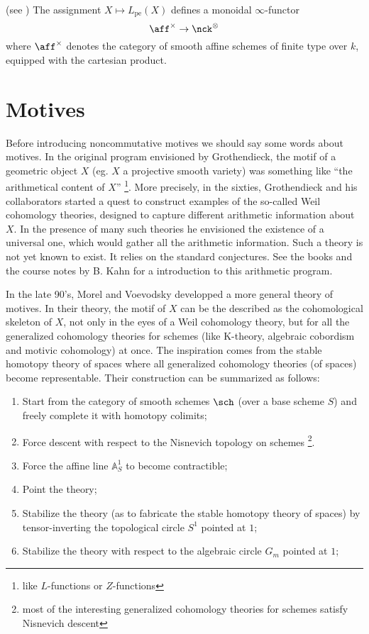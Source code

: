 \begin{refsection}
\begin{prop}(see \cite[6.38]{nc1})
The assignment $X\mapsto L_\mathrm{pe}(X)$ defines a monoidal $\infty$-functor 
$$\aff^{\times}\to \nck^{\otimes}$$
\noindent where $\aff^{\times}$ denotes the category of smooth affine schemes of finite type over $k$, equipped with the cartesian product.
\end{prop}

\section{Motives}

Before introducing noncommutative motives we should say some words about motives. In the original program envisioned by Grothendieck, the motif of a geometric object $X$ (eg. $X$ a projective smooth variety) was something like ``the arithmetical content of $X$'' \footnote{like $L$-functions or $Z$-functions}. More precisely, in the sixties, Grothendieck and his collaborators started a quest to construct examples of the so-called Weil cohomology theories, designed to capture different arithmetic information about $X$. In the presence of many such theories he envisioned the existence of a universal one, which would gather all the arithmetic information. Such a theory is not yet known to exist. It relies on the standard conjectures. See the books \cite{MR2115000, motivesSeattle} and the course notes by B. Kahn \cite{kahnzetamotives} for a introduction to this arithmetic program.

In the late 90's, Morel and Voevodsky \cite{voevodsky-morel} developped a more general theory of motives. In their theory, the motif of $X$ can be the described as the cohomological skeleton of $X$, not only in the eyes of a Weil cohomology theory, but for all the generalized cohomology theories for schemes (like K-theory, algebraic cobordism and motivic cohomology) at once. The inspiration comes from the stable homotopy theory of spaces where all generalized cohomology theories (of spaces) become representable. Their construction can be summarized as follows:

\begin{enumerate}
\item Start from the category of smooth schemes $\sch$ (over a base scheme $S$) and freely complete it with homotopy colimits;
\item Force descent with respect to the Nisnevich topology on schemes \footnote{most of the interesting generalized cohomology theories for schemes satisfy Nisnevich descent}.
\item Force the affine line $\mathbb{A}^1_S$ to become contractible;
\item Point the theory;
\item Stabilize the theory (as to fabricate the stable homotopy theory of spaces) by tensor-inverting the topological circle $S^1$ pointed at $1$;
\item Stabilize the theory with respect to the algebraic circle $G_m$ pointed at $1$;  
\end{enumerate}


\end{refsection}

